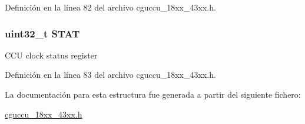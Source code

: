 Definición en la línea 82 del archivo cguccu\+\_\+18xx\+\_\+43xx.\+h.

\subsubsection[{\texorpdfstring{S\+T\+AT}{STAT}}]{ uint32\+\_\+t S\+T\+AT}\hypertarget{struct_c_c_u___c_f_g_s_t_a_t___t_a9d37b00631f37ab3e4a127a7fee46da7}{}\label{struct_c_c_u___c_f_g_s_t_a_t___t_a9d37b00631f37ab3e4a127a7fee46da7}
C\+CU clock status register 

Definición en la línea 83 del archivo cguccu\+\_\+18xx\+\_\+43xx.\+h.



La documentación para esta estructura fue generada a partir del siguiente fichero\+:\begin{DoxyCompactItemize}
\item 
\hyperlink{cguccu__18xx__43xx_8h}{cguccu\+\_\+18xx\+\_\+43xx.\+h}\end{DoxyCompactItemize}
